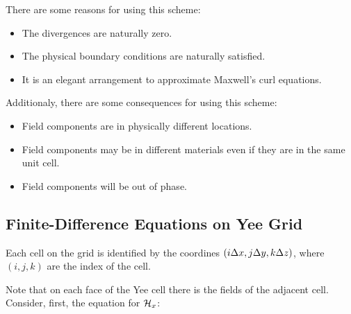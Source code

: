 

There are some reasons for using this scheme:
\begin{itemize}
    \item The divergences are naturally zero.
    \item The physical boundary conditions are naturally satisfied.
    \item It is an elegant arrangement to approximate Maxwell's curl equations.
\end{itemize}

Additionaly, there are some consequences for using this scheme:
\begin{itemize}
    \item Field components are in physically different locations.
    \item Field components may be in different materials even if they are in the same unit cell.
    \item Field components will be out of phase.
\end{itemize}

\subsection{Finite-Difference Equations on Yee Grid}

Each cell on the grid is identified by the coordines $(i\Delta x, j\Delta y, k\Delta z)$, where $(i, j, k)$ are the index of the cell.

Note that on each face of the Yee cell there is the fields of the adjacent cell. Consider, first, the equation for $\mathcal{H}_x$:

